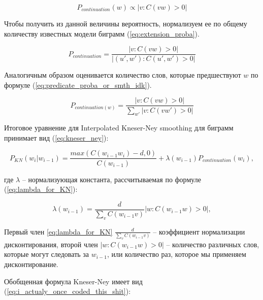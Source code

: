\begin{equation}
	P_{continuation}(w) \propto |{v: C(vw) > 0}|
	\label{eq:extension_count}
\end{equation}

Чтобы получить из данной величины вероятность, нормализуем ее по общему количеству известных модели биграмм (\ref{eq:extension_proba}).

\begin{equation}
	P_{continuation} = \frac{|{v:C(vw) > 0}|}{|{(u', w'): C(u', w') > 0}|}
	\label{eq:extension_proba}
\end{equation}

Аналогичным образом оценивается количество слов, которые предшествуют $w$ по формуле (\ref{eq:predicate_proba_or_smth_idk}).

\begin{equation}
	P_{continuation(w)} = \frac{|{v:C(vw) > 0}|}{\sum_{w'}{|{v:C(vw') > 0}|}}
	\label{eq:predicate_proba_or_smth_idk}
\end{equation}

Итоговое уравнение для Interpolated Kneser-Ney smoothing для биграмм принимает вид (\ref{eq:kneser_ney}):

\begin{equation}
	P_{KN}(w_i|w_{i-1}) = \frac{max(C(w_{i-1}w_i) - d, 0)}{C(w_{i-1})} + \lambda(w_{i-1}) P_{continuation}(w_i),
	\label{eq:kneser_ney}
\end{equation}
\begin{explanation}
	где $\lambda$ -- нормализующая константа, рассчитываемая по формуле (\ref{eq:lambda_for_KN}):
\end{explanation}

\begin{equation}
	\lambda(w_{i-1}) = \frac{d}{\sum_v{C(w_{i-1}v)}}|{w:C(w_{i-1}w) > 0}|
	\label{eq:lambda_for_KN},
\end{equation}

Первый член \ref{eq:lambda_for_KN} $\frac{d}{\sum_v{C(w_{i-1}v)}}$ -- коэффициент нормализации дисконтирования, второй член $|{w:C(w_{i-1}w) > 0}|$ -- количество различных слов, которые могут следовать за $w_{i-1}$, или количество раз, которое мы применяем дисконтирование.

Обобщенная формула Kneser-Ney имеет вид (\ref{eq:i_actualy_once_coded_this_shit}):

